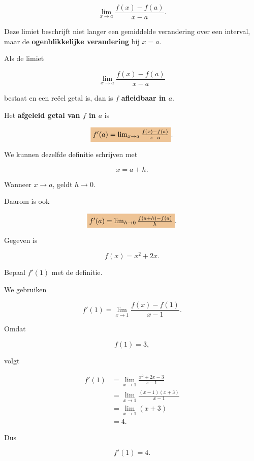 \documentclass{ximera}
\begin{document}
\[
\lim_{x\to a}
\frac{f(x)-f(a)}{x-a}.
\]

Deze limiet beschrijft niet langer een gemiddelde verandering
over een interval, maar de \textbf{ogenblikkelijke verandering}
bij $x=a$.




\begin{definitie}
Als de limiet

\[
\lim_{x\to a}
\frac{f(x)-f(a)}{x-a}
\]

bestaat en een reëel getal is, dan is $f$
\textbf{afleidbaar in $a$}.

Het \textbf{afgeleid getal van $f$ in $a$} is

\[
\important{
f'(a)
=
\lim_{x\to a}
\frac{f(x)-f(a)}{x-a}
}.
\]
\end{definitie}

We kunnen dezelfde definitie schrijven met

\[
x=a+h.
\]

Wanneer $x\to a$, geldt $h\to0$.

Daarom is ook

\[
\important{
f'(a)
=
\lim_{h\to0}
\frac{f(a+h)-f(a)}{h}
}.
\]



\begin{voorbeeld}

Gegeven is

\[
f(x)=x^2+2x.
\]

Bepaal $f'(1)$ met de definitie.

\begin{oplossing}

We gebruiken

\[
f'(1)
=
\lim_{x\to1}
\frac{f(x)-f(1)}{x-1}.
\]

Omdat

\[
f(1)=3,
\]

volgt

\begin{align*}
f'(1)
&=
\lim_{x\to1}
\frac{x^2+2x-3}{x-1}
\\
&=
\lim_{x\to1}
\frac{(x-1)(x+3)}{x-1}
\\
&=
\lim_{x\to1}(x+3)
\\
&=4.
\end{align*}

Dus

\[
\boxed{f'(1)=4}.
\]

\end{oplossing}

\end{voorbeeld}
\end{document}
